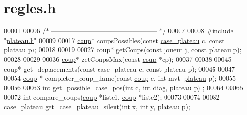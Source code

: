 \hypertarget{regles_8h_source}{
\section{regles.h}
}

\begin{DoxyCode}
00001 
00006 \textcolor{comment}{/* ----------------------------------------------- */}
00007 
00008 \textcolor{preprocessor}{#include "\hyperlink{plateau_8h}{plateau.h}"}
00009 
00017 \hyperlink{structcoup}{coup}* coupsPossibles(\textcolor{keyword}{const} \hyperlink{structcase__plateau}{case_plateau} c, \textcolor{keyword}{const} \hyperlink{structplateau}{plateau} p);
00018 
00019 
00027 \hyperlink{structcoup}{coup}* getCoups(\textcolor{keyword}{const} \hyperlink{structjoueur}{joueur} j, \textcolor{keyword}{const} \hyperlink{structplateau}{plateau} p);
00028 
00029 
00036 \hyperlink{structcoup}{coup}* getCoupsMax(\textcolor{keyword}{const} \hyperlink{structcoup}{coup} *cp);
00037 
00038 
00045 \hyperlink{structcoup}{coup}* get\_deplacements(\textcolor{keyword}{const} \hyperlink{structcase__plateau}{case_plateau} c, \textcolor{keyword}{const} \hyperlink{structplateau}{plateau} p);
00046 
00047 
00054 \hyperlink{structcoup}{coup} * completer\_coup\_dame(\textcolor{keyword}{const} \hyperlink{structcoup}{coup} c, \textcolor{keywordtype}{int} mvt, \hyperlink{structplateau}{plateau} p);
00055 
00056 
00063 \textcolor{keywordtype}{int} get\_possible\_case\_pos(\textcolor{keywordtype}{int} c, \textcolor{keywordtype}{int} diag, \hyperlink{structplateau}{plateau} p) ;
00064 
00065 
00072 \textcolor{keywordtype}{int} compare\_coups(\hyperlink{structcoup}{coup} *liste1, \hyperlink{structcoup}{coup} *liste2);
00073 
00074 
00082 \hyperlink{structcase__plateau}{case_plateau} \hyperlink{plateau_8h_a60a8f706865d0ae9087f8d65d4667655}{get_case_plateau_silent}(\textcolor{keywordtype}{int} \hyperlink{plateau_8h_a9e00f85b4b6ec2d8bdfbe94ff40f0eeeacab1e15e82c5976bfb476ddfe145263c}{x}, \textcolor{keywordtype}{int} y, \hyperlink{structplateau}{plateau} p);
\end{DoxyCode}
